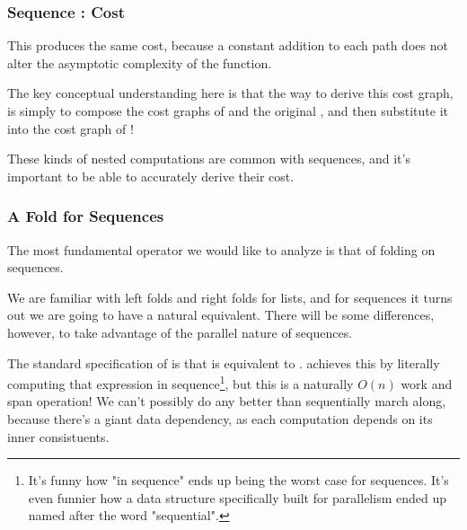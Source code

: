 \documentclass[aspectratio=169, handout]{beamer}
\begin{document}
\begin{frame}[fragile]
  \frametitle{Sequence : Cost}

  This produces the same cost, because a constant addition to each path does
  not alter the asymptotic complexity of the function.

  \pause
  \vspace{\fill}

  The key conceptual understanding here is that the way to derive this cost
  graph, is simply to compose the cost graphs of  and the original
  , and then substitute it into the cost graph of !

  \pause
  \vspace{\fill}

  These kinds of nested computations are common with sequences, and it's
  important to be able to accurately derive their cost.
\end{frame}

\begin{frame}[fragile]
  \frametitle{A Fold for Sequences}

  The most fundamental operator we would like to analyze is that of
  folding on sequences.

  \pause
  \vspace{\fill}

  We are familiar with left folds and right folds for lists, and for
  sequences it turns out we are going to have a natural equivalent. There
  will be some differences, however, to take advantage of the parallel
  nature of sequences.

  \pause
  \vspace{\fill}

  The standard specification of  is that 
  is equivalent to . 
  achieves this by literally computing that expression in sequence\footnote{It's funny how "in sequence" ends up being the worst case
  for sequences. It's even funnier how a data structure specifically built for
  parallelism ended up named after the word "sequential".},
  but this is a naturally $O(n)$ work and span operation! We can't possibly
  do any better than sequentially march along, because there's a giant data
  dependency, as each computation depends on its inner consistuents.
\end{frame}
\end{document}
